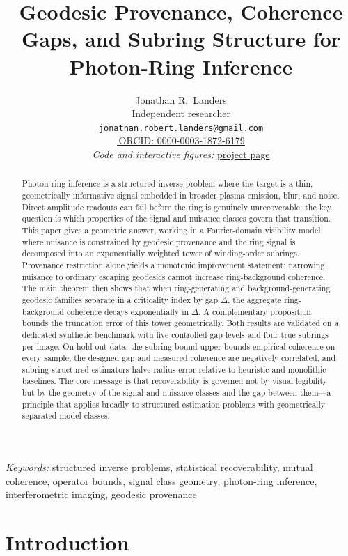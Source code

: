 \documentclass[11pt,a4paper]{article}
\title{\Large\textbf{Geodesic Provenance, Coherence Gaps, and Subring Structure for Photon-Ring Inference}}
\author{
Jonathan R.\ Landers\\[2pt]
\small Independent researcher\\[-1pt]
\small \texttt{jonathan.robert.landers@gmail.com}\\[2pt]
\small \href{https://orcid.org/0000-0003-1872-6179}{\textcolor{cOrcid}{\Large\textbullet}\,\textcolor{cBlue}{ORCID: 0000-0003-1872-6179}}\\[4pt]
\small \textit{Code and interactive figures:}
\small \href{https://jonland82.github.io/bhex-motivated-photon-ring-analysis/}{\textcolor{cBlue}{project page}}
}
\date{}
\theoremstyle{definition}
\theoremstyle{remark}
\begin{document}
\maketitle

\begin{abstract}
Photon-ring inference is a structured inverse problem where the target is a thin, geometrically informative signal embedded in broader plasma emission, blur, and noise. Direct amplitude readouts can fail before the ring is genuinely unrecoverable; the key question is which properties of the signal and nuisance classes govern that transition. This paper gives a geometric answer, working in a Fourier-domain visibility model where nuisance is constrained by geodesic provenance and the ring signal is decomposed into an exponentially weighted tower of winding-order subrings. Provenance restriction alone yields a monotonic improvement statement: narrowing nuisance to ordinary escaping geodesics cannot increase ring-background coherence. The main theorem then shows that when ring-generating and background-generating geodesic families separate in a criticality index by gap $\Delta$, the aggregate ring-background coherence decays exponentially in $\Delta$. A complementary proposition bounds the truncation error of this tower geometrically. Both results are validated on a dedicated synthetic benchmark with five controlled gap levels and four true subrings per image. On hold-out data, the subring bound upper-bounds empirical coherence on every sample, the designed gap and measured coherence are negatively correlated, and subring-structured estimators halve radius error relative to heuristic and monolithic baselines. The core message is that recoverability is governed not by visual legibility but by the geometry of the signal and nuisance classes and the gap between them---a principle that applies broadly to structured estimation problems with geometrically separated model classes.
\end{abstract}

\smallskip
\noindent\textit{Keywords:} structured inverse problems, statistical recoverability, mutual coherence, operator bounds, signal class geometry, photon-ring inference, interferometric imaging, geodesic provenance

\section{Introduction}
\end{document}
